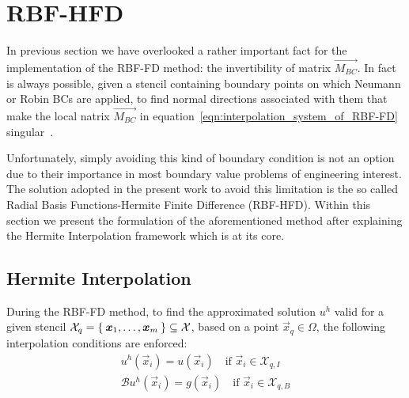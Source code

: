 


\section{RBF-HFD}

In previous section we have overlooked a rather important fact for the implementation of the RBF-FD method: the invertibility of matrix $\vec{M_{BC}}$. In fact is always possible, given a stencil containing boundary points on which Neumann or Robin BCs are applied, to find normal directions associated with them that make the local natrix $\vec{M_{BC}}$ in equation~\eqref{eqn:interpolation_system_of_RBF-FD} singular~\cite{Miotti:phd_thesis}.

Unfortunately, simply avoiding this kind of boundary condition is not an option due to their importance in most boundary value problems of engineering interest.
The solution adopted in the present work to avoid this limitation is the so called Radial Basis Functions-Hermite Finite Difference (RBF-HFD).
Within this section we present the formulation of the aforementioned method after explaining the Hermite Interpolation framework which is at its core.


\subsection{Hermite Interpolation}

During the RBF-FD method, to find the approximated solution $u^h$ valid for a given stencil $\mathcal{X}_q = \Set{\boldsymbol{x}_1, \dots, \boldsymbol{x}_m} \subseteq \mathcal{X}$, based on a point $\vec{x}_q \in \Omega$, the following interpolation conditions are enforced:
\begin{subequations}
	\label{eqn:interpolation_conditions_on_PDE_Hermite_Interpolation_subsection}
	\begin{gather}
		u^h(\vec{x}_i) = u(\vec{x}_i) \quad \text{if $\vec{x}_i \in \mathcal{X}_{q,I}$}  \label{eqn:u^h_approx_u_conditions_RBF-HFD_section} \\
		\mathcal{B} u^h(\vec{x}_i) = g(\vec{x}_i) \quad \text{if $\vec{x}_i \in \mathcal{X}_{q,B}$} \label{eqn:u^h_approx_conditions_on_boundary_RBF-HFD_section}
	\end{gather}
\end{subequations}

